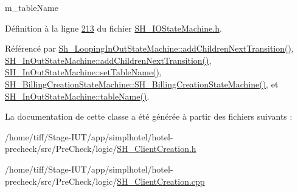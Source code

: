 m\-\_\-table\-Name 



Définition à la ligne \hyperlink{SH__IOStateMachine_8h_source_l00213}{213} du fichier \hyperlink{SH__IOStateMachine_8h_source}{S\-H\-\_\-\-I\-O\-State\-Machine.\-h}.



Référencé par \hyperlink{classSh__LoopingInOutStateMachine_acfd8d0711c793b13c759f6c50be6a315}{Sh\-\_\-\-Looping\-In\-Out\-State\-Machine\-::add\-Children\-Next\-Transition()}, \hyperlink{classSH__InOutStateMachine_a689e5513ef6ef3fc1598efacd413372e}{S\-H\-\_\-\-In\-Out\-State\-Machine\-::add\-Children\-Next\-Transition()}, \hyperlink{classSH__InOutStateMachine_a437a730d07ddd15bd96314ab0b6cf40e}{S\-H\-\_\-\-In\-Out\-State\-Machine\-::set\-Table\-Name()}, \hyperlink{classSH__BillingCreationStateMachine_ad62b77fa4aeafe200056ff3974562f83}{S\-H\-\_\-\-Billing\-Creation\-State\-Machine\-::\-S\-H\-\_\-\-Billing\-Creation\-State\-Machine()}, et \hyperlink{classSH__InOutStateMachine_a18b07a985695100612bbcbda870933b4}{S\-H\-\_\-\-In\-Out\-State\-Machine\-::table\-Name()}.



La documentation de cette classe a été générée à partir des fichiers suivants \-:\begin{DoxyCompactItemize}
\item 
/home/tiff/\-Stage-\/\-I\-U\-T/app/simplhotel/hotel-\/precheck/src/\-Pre\-Check/logic/\hyperlink{SH__ClientCreation_8h}{S\-H\-\_\-\-Client\-Creation.\-h}\item 
/home/tiff/\-Stage-\/\-I\-U\-T/app/simplhotel/hotel-\/precheck/src/\-Pre\-Check/logic/\hyperlink{SH__ClientCreation_8cpp}{S\-H\-\_\-\-Client\-Creation.\-cpp}\end{DoxyCompactItemize}
